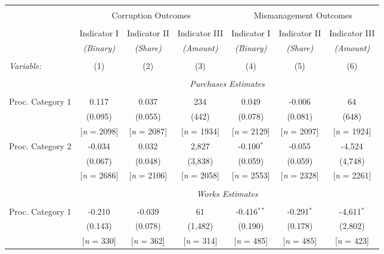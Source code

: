 \documentclass[border = 1pt$]{standalone}
\begin{document}
\scriptsize
\setlength{\tabcolsep}{-2pt}
\begin{tabular}{@{\extracolsep{6pt}}lcccccc}
\\[-1.8ex]\hline
\hline \\[-1.8ex]
& \multicolumn{3}{c}{Corruption Outcomes} & \multicolumn{3}{c}{Mismanagement Outcomes} \\
\cline{2-4} \cline{5-7} \\[-.8ex]
& Indicator I & Indicator II & Indicator III & Indicator I & Indicator II & Indicator III \\[1.0ex]
& \emph{(Binary)} & \emph{(Share)} & \emph{(Amount)} & \emph{(Binary)} & \emph{(Share)} & \emph{(Amount)} \\[1.0ex]
\cline{2-4} \cline{5-7} \\[-.8ex]
\emph{Variable:} & (1) & (2) & (3) & (4) & (5) & (6) \\[1.0ex]
\hline \\[-.8ex]
& \multicolumn{6}{c}{\emph{Purchases Estimates}} \\[1.0ex]
\cline{2-7} \\[-.8ex]
Proc. Category 1   & 0.117   & 0.037   & 234      & 0.049         & -0.006  & 64      \\[1.0ex]
                     & (0.095) & (0.055) & (442)    & (0.078)       & (0.081) & (648)   \\[1.0ex]
                     & [\emph{n} = 2098] & [\emph{n} = 2087] & [\emph{n} = 1934] & [\emph{n} = 2129] & [\emph{n} = 2097] & [\emph{n} = 1924] \\[1.0ex]
Proc. Category 2  & -0.034  & 0.032   & 2,827     & -0.100$^{*}$  & -0.055  & -4,524   \\[1.0ex]
                     & (0.067) & (0.048) & (3,838)   & (0.059)       & (0.059) & (4,748)  \\[1.0ex]
                     & [\emph{n} = 2686] & [\emph{n} = 2106] & [\emph{n} = 2058] & [\emph{n} = 2553] & [\emph{n} = 2328] & [\emph{n} = 2261] \\[1.0ex]
\hline \\[-.8ex] & \multicolumn{6}{c}{\emph{Works Estimates}} \\[1.0ex]
\cline{2-7} \\[-.8ex]
Proc. Category 1   & -0.210  & -0.039  & 61       & -0.416$^{**}$ & -0.291$^{*}$  & -4,611$^{*}$ \\[1.0ex]
                     & (0.143) & (0.078) & (1,482)   & (0.190)       & (0.178)       & (2,802)      \\[1.0ex]
                     & [\emph{n} = 330]  & [\emph{n} = 362]  & [\emph{n} = 314]  & [\emph{n} = 485]  & [\emph{n} = 485]  & [\emph{n} = 423]  \\[1.0ex]

\end{tabular}
\end{document}
